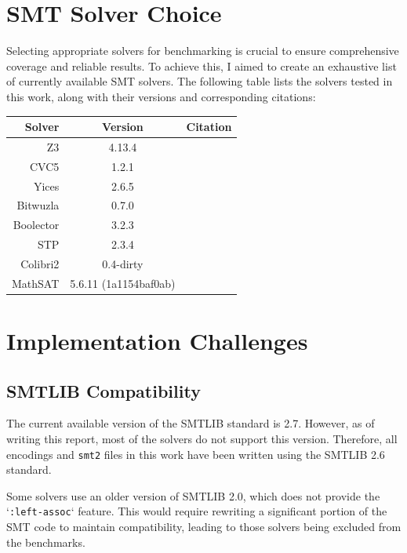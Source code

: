 \documentclass[a4paper]{report}
\begin{document}
\section{SMT Solver Choice}
\label{sec:smt-solver-choice}
Selecting appropriate solvers for benchmarking is crucial to ensure comprehensive coverage and reliable results.
To achieve this, I aimed to create an exhaustive list of currently available SMT solvers.
The following table lists the solvers tested in this work, along with their versions and corresponding citations:

\begin{center}	\begin{tabular}{|r|c|l|}
		\hline
		\textbf{Solver} & \textbf{Version} & \textbf{Citation} \\
		\hline
		Z3 & 4.13.4 & \cite{z3} \\
		CVC5 & 1.2.1 & \cite{cvc5} \\
		Yices & 2.6.5 & \cite{yices2} \\
		Bitwuzla & 0.7.0 & \cite{bitwuzla} \\
		Boolector & 3.2.3 & \cite{boolector} \\
		STP & 2.3.4 & \cite{stp} \\
		Colibri2 & 0.4-dirty & \cite{colibri2} \\
		MathSAT & 5.6.11 (1a1154baf0ab) & \cite{MathSAT} \\
		\hline
	\end{tabular}
\end{center}

\section{Implementation Challenges}
\subsection{SMTLIB Compatibility}
\label{ssec:smtlib-compatibility}
The current available version of the SMTLIB standard is 2.7.
However, as of writing this report, most of the solvers do not support this version.
Therefore, all encodings and \texttt{smt2} files in this work have been written using the SMTLIB 2.6 standard. \cite{SMTLIB}

Some solvers use an older version of SMTLIB 2.0, which does not provide the `\verb|:left-assoc|` feature.
This would require rewriting a significant portion of the SMT code to maintain compatibility, leading to those solvers being excluded from the benchmarks.
\end{document}
